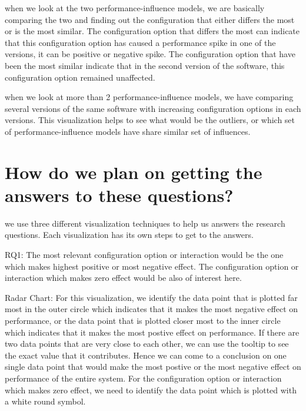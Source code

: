 when we look at the two performance-influence models, we are basically comparing the two and finding out the configuration that either differs the most or is the most similar. The configuration option that differs the most can indicate that this configuration option has caused a performance spike in one of the versions, it can be positive or negative spike. The configuration option that have been the most similar indicate that in the second version of the software, this configuration option remained unaffected.

when we look at more than 2 performance-influence models, we have comparing several versions of the same software with increasing configuration options in each versions. This visualization helps to see what would be the outliers, or which set of performance-influence models have share similar set of influences.

\section{How do we plan on getting the answers to these questions?}

we use three different visualization techniques to help us answers the research questions. Each visualization has its own steps to get to the answers.

RQ1: The  most relevant configuration option or interaction would be the one which makes highest positive or most negative effect. The configuration option or interaction which makes zero effect would be also of interest here.

Radar Chart:  For this visualization, we identify the data point that is plotted far most in the outer circle which indicates that it makes the most negative effect on performance, or the data point that is plotted closer most to the inner circle which indicates that it makes the most postive effect on performance. If there are two data points that are very close to each other, we can use the tooltip to see the exact value that it contributes. Hence we can come to a conclusion on one single data point that would make the most postive or the most negative effect on performance of the entire system. For the configuration option or interaction which makes zero effect, we need to identify the data point which is plotted with a white round symbol.

